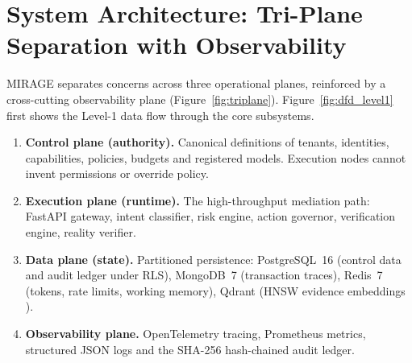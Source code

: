 \documentclass[11pt,a4paper]{article}
\begin{document}
\section{System Architecture: Tri-Plane Separation with Observability}
MIRAGE separates concerns across three operational planes, reinforced by a cross-cutting observability plane (Figure~\ref{fig:triplane}). Figure~\ref{fig:dfd_level1} first shows the Level-1 data flow through the core subsystems.
\begin{enumerate}[leftmargin=*,itemsep=1pt]
  \item \textbf{Control plane (authority).} Canonical definitions of tenants, identities, capabilities, policies, budgets and registered models. Execution nodes cannot invent permissions or override policy.
  \item \textbf{Execution plane (runtime).} The high-throughput mediation path: FastAPI gateway, intent classifier, risk engine, action governor, verification engine, reality verifier.
  \item \textbf{Data plane (state).} Partitioned persistence: PostgreSQL~16 (control data and audit ledger under RLS), MongoDB~7 (transaction traces), Redis~7 (tokens, rate limits, working memory), Qdrant (HNSW evidence embeddings \cite{malkov2020}).
  \item \textbf{Observability plane.} OpenTelemetry tracing, Prometheus metrics, structured JSON logs and the SHA-256 hash-chained audit ledger.
\end{enumerate}
\end{document}
